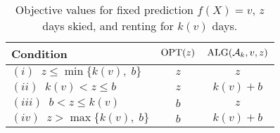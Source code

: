\begin{table}[t]
\caption{Objective values for fixed prediction $f(X)=v$, $z$ days skied, and renting for $k(v)$ days.}
\label{table: cr-landscape}
\vskip 0in
\begin{center}
\begin{small}
\begin{sc}
\begin{tabular}{lcc}
\toprule
Condition  & $\textnormal{OPT}(z)$ & $\textnormal{ALG}(\mathcal{A}_k, v, z)$ \\
\midrule
$(i) \;\; z \leq \min\{k(v), \; b\}$ & $z$ & $z$ \\
$(ii) \;\; k(v) < z \leq b$ & $z$ & $k(v) + b$ \\
$(iii) \;\; b < z \leq k(v)$ & $b$ & $z$ \\
$(iv) \;\; z > \max\{k(v), \; b\}$ & $b$ & $k(v) + b$  \\
\bottomrule
\end{tabular}
\end{sc}
\end{small}
\end{center}
\end{table}

